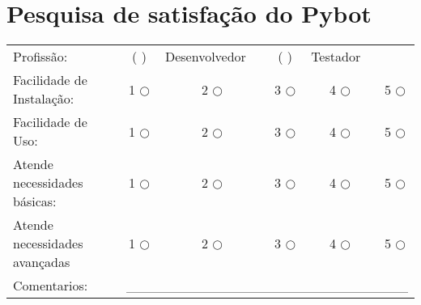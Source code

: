 %
%

\begin{apendicesenv}
\label{app:quest}

    \chapter{Pesquisa de satisfação do Pybot}

    \begin{table}[H]
    \setlength\extrarowheight{25pt}
    \begin{tabular}{lccccc}
        Profissão:                    & (  )         & \multicolumn{1}{l}{Desenvolvedor}  & (  )         & \multicolumn{1}{l}{Testador}   &              \\
        Facilidade de Instalação:     & 1 $\bigcirc$ & 2 $\bigcirc$                       & 3 $\bigcirc$ & 4 $\bigcirc$                   & 5 $\bigcirc$ \\
        Facilidade de Uso:            & 1 $\bigcirc$ & 2 $\bigcirc$                       & 3 $\bigcirc$ & 4 $\bigcirc$                   & 5 $\bigcirc$ \\
        Atende necessidades básicas:  & 1 $\bigcirc$ & 2 $\bigcirc$                       & 3 $\bigcirc$ & 4 $\bigcirc$                   & 5 $\bigcirc$ \\
        Atende necessidades avançadas & 1 $\bigcirc$ & 2 $\bigcirc$                       & 3 $\bigcirc$ & 4 $\bigcirc$                   & 5 $\bigcirc$ \\
        Comentarios:                  & \multicolumn{5}{l}{\_\_\_\_\_\_\_\_\_\_\_\_\_\_\_\_\_\_\_\_\_\_\_\_\_\_\_\_\_}
    \end{tabular}
    \end{table}

\end{apendicesenv}
